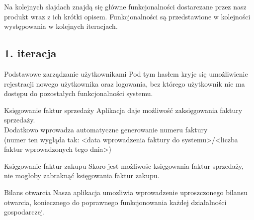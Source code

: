 \documentclass{beamer}
\begin{document}
  \begin{frame}
    \begin{block}{}
      Na kolejnych slajdach znajdą się główne funkcjonalności dostarczane przez nasz produkt wraz z ich krótki opisem. Funkcjonalności są przedstawione w kolejności występowania w kolejnych iteracjach.
    \end{block}
  \end{frame}
\subsection{1. iteracja}
  \begin{frame}
    \begin{block}{Podstawowe zarządzanie użytkownikami}
      Pod tym hasłem kryje się umożliwienie rejestracji nowego użytkownika oraz logowania, bez którego użytkownik nie ma dostępu do pozostałych funkcjonalności systemu.
    \end{block}
  \end{frame}
  \begin{frame}
    \begin{block}{Księgowanie faktur sprzedaży}
      Aplikacja daje możliwość zaksięgowania faktury sprzedaży.\\
      Dodatkowo wprowadza automatyczne generowanie numeru faktury\\
      (numer ten wygląda tak: <data wprowadzenia faktury do systemu>/<liczba faktur wprowadzonych tego dnia>)
    \end{block}
  \end{frame}
  \begin{frame}
    \begin{block}{Księgowanie faktur zakupu}
      Skoro jest możliwośc księgowania faktur sprzedaży, nie mogłoby zabraknąć księgowania faktur zakupu.
    \end{block}
  \end{frame}
  \begin{frame}
    \begin{block}{Bilans otwarcia}
      Nasza aplikacja umozliwia wprowadzenie uproszczonego bilansu otwarcia, koniecznego do poprawnego funkcjonowania każdej działalności gospodarczej.
    \end{block}
  \end{frame}
\end{document}
